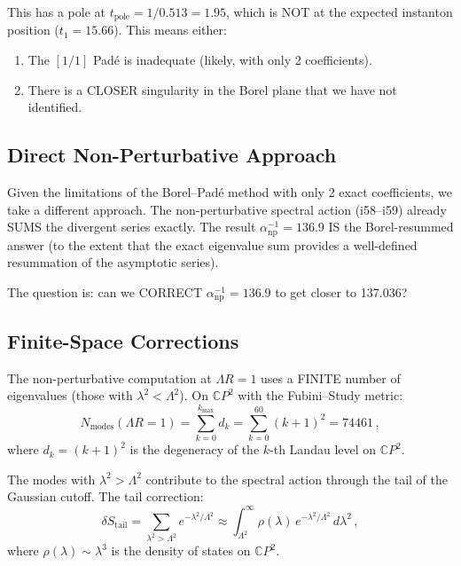 \documentclass[11pt,a4paper]{article}
\newcommand{\CP}{\mathbb{C}P}
\begin{document}
This has a pole at $t_{\mathrm{pole}} = 1/0.513 = 1.95$, which is NOT at the expected instanton position ($t_1 = 15.66$). This means either:
\begin{enumerate}
\item The $[1/1]$ Pad\'e is inadequate (likely, with only 2 coefficients).
\item There is a CLOSER singularity in the Borel plane that we have not identified.
\end{enumerate}

\subsection{Direct Non-Perturbative Approach}

Given the limitations of the Borel--Pad\'e method with only 2 exact coefficients, we take a different approach. The non-perturbative spectral action (i58--i59) already SUMS the divergent series exactly. The result $\alpha^{-1}_{\mathrm{np}} = 136.9$ IS the Borel-resummed answer (to the extent that the exact eigenvalue sum provides a well-defined resummation of the asymptotic series).

The question is: can we CORRECT $\alpha^{-1}_{\mathrm{np}} = 136.9$ to get closer to 137.036?

\subsection{Finite-Space Corrections}

The non-perturbative computation at $\Lambda R = 1$ uses a FINITE number of eigenvalues (those with $\lambda^2 < \Lambda^2$). On $\CP^2$ with the Fubini--Study metric:
\begin{equation}
N_{\mathrm{modes}}(\Lambda R = 1) = \sum_{k=0}^{k_{\max}} d_k = \sum_{k=0}^{60} (k+1)^2 = 74461\,,
\end{equation}
where $d_k = (k+1)^2$ is the degeneracy of the $k$-th Landau level on $\CP^2$.

The modes with $\lambda^2 > \Lambda^2$ contribute to the spectral action through the tail of the Gaussian cutoff. The tail correction:
\begin{equation}
\delta S_{\mathrm{tail}} = \sum_{\lambda^2 > \Lambda^2} e^{-\lambda^2/\Lambda^2} \approx \int_{\Lambda^2}^{\infty} \rho(\lambda)\,e^{-\lambda^2/\Lambda^2}\,d\lambda^2\,,
\end{equation}
where $\rho(\lambda) \sim \lambda^3$ is the density of states on $\CP^2$.
\end{document}
